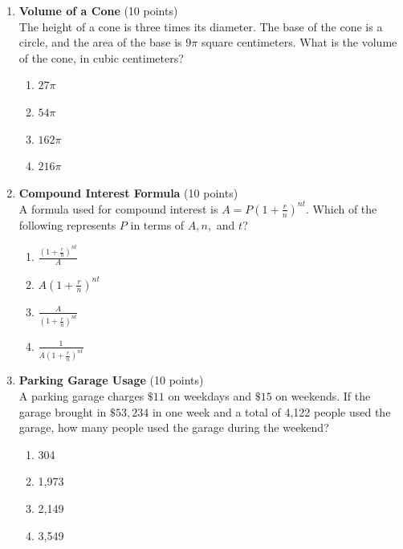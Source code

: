 \begin{enumerate}
  \item \textbf{Volume of a Cone} (10 points)\\
  The height of a cone is three times its diameter. The base of the cone is a circle, and the area of the base is $9\pi$ square centimeters. What is the volume of the cone, in cubic centimeters?
  \begin{enumerate}[label=\Alph*.]
    \item $27\pi$
    \item $54\pi$
    \item $162\pi$
    \item $216\pi$
  \end{enumerate}
  \begin{subanswer}
  \end{subanswer}

  \item \textbf{Compound Interest Formula} (10 points)\\
  A formula used for compound interest is $A = P\left(1 + \frac{r}{n}\right)^{nt}$. Which of the following represents $P$ in terms of $A, n,$ and $t$?
  \begin{enumerate}[label=\Alph*.]
    \item $\frac{\left(1 + \frac{r}{n}\right)^{nt}}{A}$
    \item $A\left(1 + \frac{r}{n}\right)^{nt}$
    \item $\frac{A}{\left(1 + \frac{r}{n}\right)^{nt}}$
    \item $\frac{1}{A\left(1 + \frac{r}{n}\right)^{nt}}$
  \end{enumerate}
  \begin{subanswer}
  \end{subanswer}

  \item \textbf{Parking Garage Usage} (10 points)\\
  A parking garage charges $\$11$ on weekdays and $\$15$ on weekends. If the garage brought in $\$53,234$ in one week and a total of 4,122 people used the garage, how many people used the garage during the weekend?
  \begin{enumerate}[label=\Alph*.]
    \item 304
    \item 1,973
    \item 2,149
    \item 3,549
  \end{enumerate}
  \begin{subanswer}
  \end{subanswer}


\end{enumerate}
